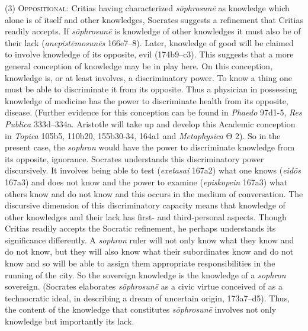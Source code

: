 (3) \textsc{Oppositional}: Critias having characterized \emph{sōphrosunē} as knowledge which alone is of itself and other knowledges, Socrates suggests a refinement that Critias readily accepts. If \emph{sōphrosunē} is knowledge of other knowledges it must also be of their lack (\emph{anepistēmosunēs} 166e7–8). Later, knowledge of good will be claimed to involve knowledge of its opposite, evil (174b9–c3). This suggests that a more general conception of knowledge may be in play here. On this conception, knowledge is, or at least involves, a discriminatory power. To know a thing one must be able to discriminate it from its opposite.  Thus a physician in possessing knowledge of medicine has the power to discriminate health from its opposite, disease. (Further evidence for this conception can be found in \emph{Phaedo} 97d1-5, \emph{Res Publica} 333d–334a. Aristotle will take up and develop this Academic conception in \emph{Topica} 105b5, 110b20, 155b30-34, 164a1 and \emph{Metaphysica} {\sbl Θ} 2). So in the present case, the \emph{sophron} would have the power to discriminate knowledge from its opposite, ignorance. Socrates understands this discriminatory power discursively. It involves being able to test (\emph{exetasai} 167a2) what one knows (\emph{eidōs} 167a3) and does not know and the power to examine (\emph{episkopein} 167a3) what others know and do not know and this occurs in the medium of conversation. The discursive dimension of this discriminatory capacity means that knowledge of other knowledges and their lack has first- and third-personal aspects. Though Critias readily accepts the Socratic refinement, he perhaps understands its significance differently. A \emph{sophron} ruler will not only know what they know and do not know, but they will also know what their subordinates know and do not know and so will be able to assign them appropriate responsibilities in the running of the city. So the sovereign knowledge is the knowledge of a \emph{sophron} sovereign. (Socrates elaborates \emph{sōphrosunē} as a civic virtue conceived of as a technocratic ideal, in describing a dream of uncertain origin, 173a7–d5). Thus, the content of the knowledge that constitutes \emph{sōphrosunē} involves not only knowledge but importantly its lack. 

